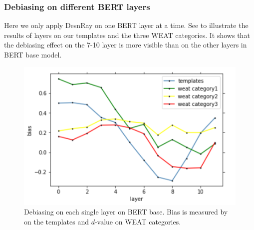 \subsubsection{Debiasing on different BERT layers}
Here we only apply DesnRay on one BERT layer at a time. See  to illustrate the results of layers on our templates and the three WEAT categories. It shows that the debiasing effect on the 7-10 layer is more visible than on the other layers in BERT base model.
\begin{figure}
	\centering
	\includegraphics[width=0.9\linewidth]{layers_base}
	\caption{Debiasing on each single layer on BERT base. Bias is measured by  on the templates and $d$-value on WEAT categories. }
\end{figure}

